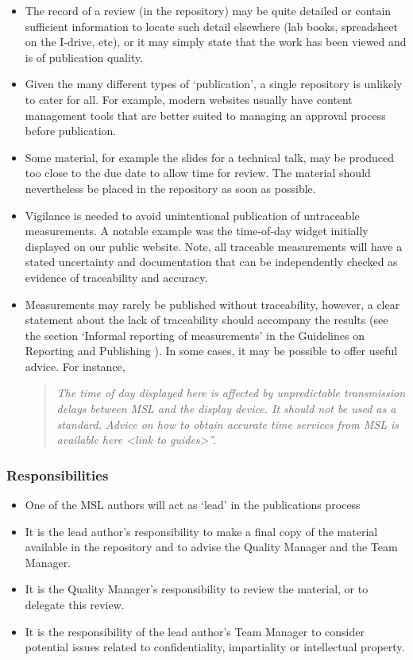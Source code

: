\begin{itemize}
\item  The record of a review (in the repository) may be quite detailed or contain sufficient information to locate such detail elsewhere (lab books, spreadsheet on the I-drive, etc), or it may simply state that the work has been viewed and is of publication quality.  
\item  Given the many different types of ‘publication’, a single repository is unlikely to cater for all. For example, modern websites usually have content management tools that are better suited to managing an approval process before publication.  
\item  Some material, for example the slides for a technical talk, may be produced too close to the due date to allow time for review. The material should nevertheless be placed in the repository as soon as possible. 
\item  Vigilance is needed to avoid unintentional publication of untraceable measurements. A notable example was the time-of-day widget initially displayed on our public website. Note, all traceable measurements will have a stated uncertainty and documentation that can be independently checked as evidence of traceability and accuracy.
\item  Measurements may rarely be published without traceability, however, a clear statement about the lack of traceability should accompany the results (see the section ‘Informal reporting of measurements’ in the Guidelines on Reporting and Publishing \cite[\S\ref*{GRP-ss:informal_reporting}]{MSL_Reporting_Guidelines}). In some cases, it may be possible to offer useful advice. For instance, 
\begin{quote}\textit{
The time of day displayed here is affected by unpredictable transmission delays between MSL and the display device. It should not be used as a standard. Advice on how to obtain accurate time services from MSL is available here <link to guides>”.
}\end{quote} 
\end{itemize}

\subsubsection{Responsibilities}
\begin{itemize}
\item  One of the MSL authors will act as ‘lead’ in the publications process
\item  It is the lead author’s responsibility to make a final copy of the material available in the repository and to advise the Quality Manager and the Team Manager.
\item  It is the Quality Manager’s responsibility to review the material, or to delegate this review.
\item  It is the responsibility of the lead author’s Team Manager to consider potential issues related to confidentiality, impartiality or intellectual property.
\end{itemize}

